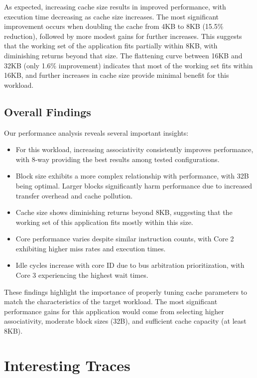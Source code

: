 \documentclass[a4paper,12pt]{article}
\begin{document}
As expected, increasing cache size results in improved performance, with execution time decreasing as cache size increases. The most significant improvement occurs when doubling the cache from 4KB to 8KB (15.5\% reduction), followed by more modest gains for further increases. This suggests that the working set of the application fits partially within 8KB, with diminishing returns beyond that size. The flattening curve between 16KB and 32KB (only 1.6\% improvement) indicates that most of the working set fits within 16KB, and further increases in cache size provide minimal benefit for this workload.

\subsection{Overall Findings}

Our performance analysis reveals several important insights:
\begin{itemize}
    \item For this workload, increasing associativity consistently improves performance, with 8-way providing the best results among tested configurations.
    \item Block size exhibits a more complex relationship with performance, with 32B being optimal. Larger blocks significantly harm performance due to increased transfer overhead and cache pollution.
    \item Cache size shows diminishing returns beyond 8KB, suggesting that the working set of this application fits mostly within this size.
    \item Core performance varies despite similar instruction counts, with Core 2 exhibiting higher miss rates and execution times.
    \item Idle cycles increase with core ID due to bus arbitration prioritization, with Core 3 experiencing the highest wait times.
\end{itemize}

These findings highlight the importance of properly tuning cache parameters to match the characteristics of the target workload. The most significant performance gains for this application would come from selecting higher associativity, moderate block sizes (32B), and sufficient cache capacity (at least 8KB).

\section{Interesting Traces}
\end{document}
